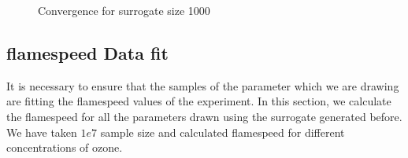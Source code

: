 \begin{figure}[H]
\centering
{}
    \caption{Convergence for surrogate size 1000}
\end{figure}


\subsection{flamespeed Data fit}

 It is necessary to ensure that the samples of the parameter which we are drawing are fitting the flamespeed values of the experiment. In this section, we calculate the flamespeed for all the parameters drawn using the surrogate generated before. We have taken $1e7$ sample size and calculated flamespeed for different concentrations of ozone. 

